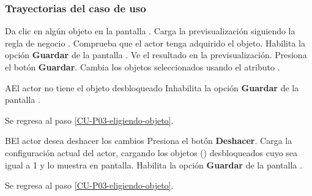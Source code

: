 \subsubsection{Trayectorias del caso de uso}

\begin{UCtrayectoria}%
%
    \Actor Da clic en algún objeto en la pantalla .
    \label{CU-P03-eligiendo-objeto}
    \Sistema Carga la previsualización siguiendo la regla de negocio .
    \Sistema Comprueba que el actor tenga adquirido el objeto. 
    \Sistema Habilita la opción \textbf{Guardar} de la pantalla .
    \Actor Ve el resultado en la previsualización. 
    \Actor Presiona el botón \textbf{Guardar}.
    \Sistema Cambia los objetos seleccionados usando el atributo .
    
\end{UCtrayectoria}

\begin{UCtrayectoriaA}%
  {A}{El actor no tiene el objeto desbloqueado }
    \Sistema Inhabilita la opción \textbf{Guardar} de la pantalla .
    \item Se regresa al paso \ref{CU-P03-eligiendo-objeto}.

\end{UCtrayectoriaA}


\begin{UCtrayectoriaA}%
  {B}{El actor desea deshacer los cambios }
    \Actor  Presiona el botón \textbf{Deshacer}.
    \Sistema Carga la configuración actual del actor, 
        cargando los objetos  () desbloqueados cuyo
         sea igual a 1  y lo muestra en pantalla.
    \Sistema Habilita la opción \textbf{Guardar} de la pantalla .
    \item Se regresa al paso \ref{CU-P03-eligiendo-objeto}.

\end{UCtrayectoriaA}